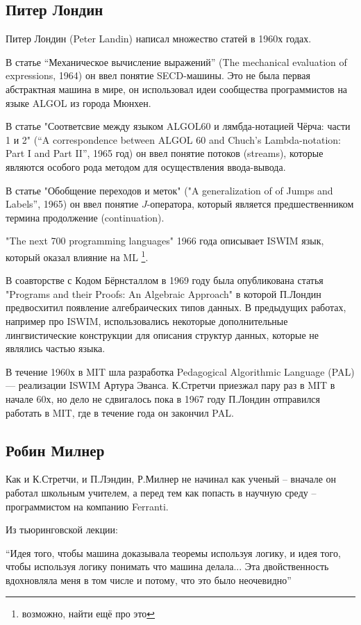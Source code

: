 \documentclass[14pt]{matmex-diploma-custom}
\begin{document}
\subsection{Питер Лондин}
Питер Лондин (Peter Landin) %
написал множество статей в 1960х годах.

В статье “Механическое вычисление выражений” (The mechanical evaluation of expressions, 1964) он ввел понятие SECD-машины. Это не была  первая абстрактная машина в мире, он использовал идеи сообщества программистов на языке ALGOL из города Мюнхен. 

В статье "Соответсвие между языком ALGOL60 и лямбда-нотацией Чёрча: части 1 и 2" (“A correspondence between ALGOL 60 and Chuch’s Lambda-notation: Part I and Part II”, 1965 год) он ввел понятие потоков (streams), которые являются особого рода методом для осуществления ввода-вывода.

В статье "Обобщение переходов и меток" ("A generalization of of Jumps and Labels”, 1965) он ввел понятие $J$-оператора, который является предшественником термина продолжение (continuation).

"The next 700 programming languages" 1966 года описывает ISWIM язык, который оказал влияние на ML \footnote{возможно, найти ещё про это}.

В соавторстве с Кодом Бёрнсталлом в 1969 году была опубликована статья "Programs and their Proofs: An Algebraic Approach" в которой П.Лондин предвосхитил появление алгебраических типов данных. В предыдущих работах, например про ISWIM, использовались некоторые дополнительные лингвистические конструкции для описания структур данных, которые не являлись частью языка.

В течение 1960х в MIT шла разработка Pedagogical Algorithmic Language (PAL) --- реализации ISWIM Артура Эванса. К.Стретчи приезжал пару раз в MIT в начале 60х, но дело не сдвигалось пока в 1967 году П.Лондин отправился работать в MIT, где в течение года он закончил PAL.

\subsection{Робин Милнер}

Как и К.Стретчи, и П.Лэндин, Р.Милнер не начинал как ученый -- вначале он работал школьным учителем, а перед тем как попасть в научную среду -- программистом на компанию Ferranti.
\begin{framed}
Из тьюринговской лекции:

“Идея того, чтобы машина доказывала теоремы используя логику, и идея того, чтобы используя логику понимать что машина делала... Эта двойственность вдохновляла меня в том числе и потому, что это было неочевидно”
\end{framed}
\end{document}
